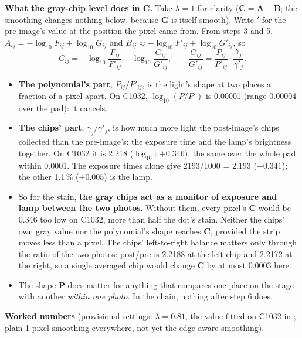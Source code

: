 \documentclass[11pt,letter]{article}
\newcommand{\file}[1]{\texttt{\seqsplit{#1}}}
\newcommand{\mP}{\mathbf{P}}   %
\newcommand{\mG}{\mathbf{G}}   %
\newcommand{\mA}{\mathbf{A}}   %
\newcommand{\mB}{\mathbf{B}}   %
\newcommand{\mC}{\mathbf{C}}   %
\begin{document}
\textbf{What the gray-chip level does in $\mC$.}  Take $\lambda = 1$ for
clarity ($\mC = \mA - \mB$; the smoothing changes nothing below, because
$\mG$ is itself smooth).  Write $'$ for the pre-image's value at the
position the pixel came from.  From steps 3 and 5,
$A_{ij} = -\log_{10} F_{ij} + \log_{10} G_{ij}$ and
$B_{ij} \approx -\log_{10} F'_{ij} + \log_{10} G'_{ij}$, so
\begin{equation}
  C_{ij} = -\log_{10}\frac{F_{ij}}{F'_{ij}}
          + \log_{10}\frac{G_{ij}}{G'_{ij}},
  \qquad
  \frac{G_{ij}}{G'_{ij}} = \frac{P_{ij}}{P'_{ij}} \cdot
                           \frac{\gamma_j}{\gamma'_j}.
\end{equation}
\begin{itemize}
  \item \textbf{The polynomial's part}, $P_{ij}/P'_{ij}$, is the light's
    shape at two places a fraction of a pixel apart.  On C1032,
    $\log_{10}(P/P')$ is 0.00001 (range 0.00004 over the pad): it cancels.
  \item \textbf{The chips' part}, $\gamma_j/\gamma'_j$, is how much more
    light the post-image's chips collected than the pre-image's: the
    exposure time and the lamp's brightness together.  On C1032 it is 2.218
    ($\log_{10}$: $+0.346$), the same over the whole pad within 0.0001.  The
    exposure times alone give 2193/1000 = 2.193 ($+0.341$); the other 1.1\,\%
    ($+0.005$) is the lamp.
  \item So for the stain, \textbf{the gray chips act as a monitor of
    exposure and lamp between the two photos}.  Without them, every pixel's
    $\mC$ would be 0.346 too low on C1032, more than half the dot's stain.
    Neither the chips' own gray value nor the polynomial's shape reaches
    $\mC$, provided the strip moves less than a pixel.  The chips'
    left-to-right balance matters only through the ratio of the two photos:
    post/pre is 2.2188 at the left chip and 2.2172 at the right, so a single
    averaged chip would change $\mC$ by at most 0.0003 here.
  \item The shape $\mP$ does matter for anything that compares one place on
    the stage with another \emph{within one photo}.  In the chain, nothing
    after step 6 does.
\end{itemize}

\textbf{Worked numbers} (provisional settings: $\lambda = 0.81$, the value
fitted on C1032 in \file{shading\_removal.tex}; plain 1-pixel smoothing
everywhere, not yet the edge-aware smoothing).
\end{document}

